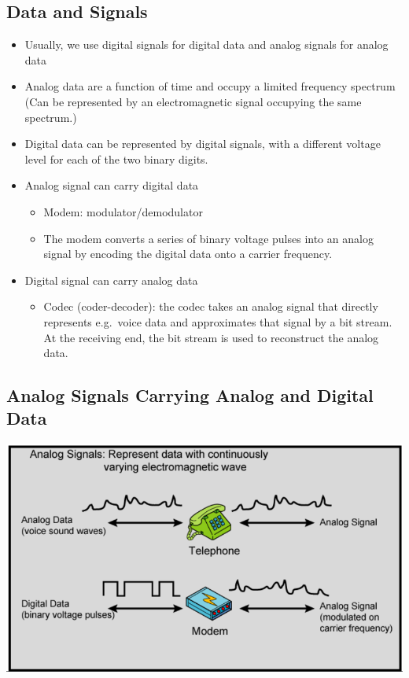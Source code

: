 \documentclass[11pt]{article}
\begin{document}
\subsection{Data and Signals}
\begin{itemize}
    \item Usually, we use digital signals for digital data and analog signals for analog data
    \item Analog data are a function of time and occupy a limited frequency spectrum (Can be represented by an electromagnetic signal occupying the same spectrum.)
    \item Digital data can be represented by digital signals, with a different voltage level for each of the two binary digits.
    \item Analog signal can carry digital data
    \begin{itemize}
        \item Modem: modulator/demodulator
        \item The modem converts a series of binary voltage pulses into an analog signal by encoding the digital data onto a carrier frequency.
    \end{itemize}
    \item Digital signal can carry analog data
    \begin{itemize}
        \item Codec (coder-decoder): the codec takes an analog signal that directly represents e.g.\ voice data and approximates that signal by a bit stream. At the receiving end, the bit stream is used to reconstruct the analog data.
    \end{itemize}
\end{itemize}
\subsection{Analog Signals Carrying Analog and Digital Data}
\includegraphics[width=\textwidth]{analog-signals-carrying-analog-and-digital-data}
\end{document}
